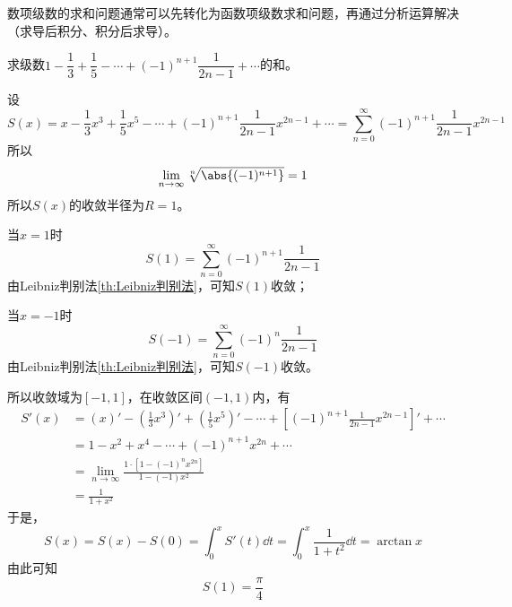 数项级数的求和问题通常可以先转化为函数项级数求和问题，再通过分析运算解决（求导后积分、积分后求导）。
\begin{example}
    求级数$1 - \dfrac{1}{3} + \dfrac{1}{5} - \cdots + (-1)^{n+1}\dfrac{1}{2n-1} + \cdots$的和。
\end{example}
\begin{solution}
    设
    \[
        S(x) = x - \frac{1}{3}x^3 + \frac{1}{5}x^5 - \cdots + (-1)^{n+1}\frac{1}{2n-1}x^{2n-1} + \cdots
        =\sum_{n=0}^\infty (-1)^{n+1}\frac{1}{2n-1}x^{2n-1}
    \]
    所以
    \[  \lim_{n\to\infty} \sqrt[n]{\abs{(-1)^{n+1}}} = 1 \]
    所以$S(x)$的收敛半径为$R=1$。

    当$x=1$时
    \[ S(1) = \sum_{n=0}^\infty (-1)^{n+1}\frac{1}{2n-1} \]
    由Leibniz判别法\ref{th:Leibniz判别法}，可知$S(1)$收敛；

    当$x=-1$时
    \[ S(-1) = \sum_{n=0}^\infty (-1)^{n}\frac{1}{2n-1} \]
    由Leibniz判别法\ref{th:Leibniz判别法}，可知$S(-1)$收敛。

    所以收敛域为$[-1,1]$，在收敛区间$(-1,1)$内，有
    \begin{align*}
        S'(x)
         & = (x)' - \left(\frac{1}{3}x^3\right)' + \left(\frac{1}{5}x^5\right)' - \cdots + \left[(-1)^{n+1}\frac{1}{2n-1}x^{2n-1}\right]' + \cdots \\
         & = 1 - x^2 + x^4 - \cdots + (-1)^{n+1}x^{2n} + \cdots                                                                                    \\
         & = \lim_{n\to\infty} \frac{1\cdot[1-(-1)^nx^{2n}]}{1-(-1)x^2}                                                                            \\
         & = \frac{1}{1+x^2}
    \end{align*}
    于是，
    \[ S(x) = S(x) - S(0)=\int_0^x S'(t)\dd{t} = \int_0^x \frac{1}{1+t^2}\dd{t} = \arctan x \]
    由此可知
    \[ S(1) = \frac{\pi}{4} \]
\end{solution}

